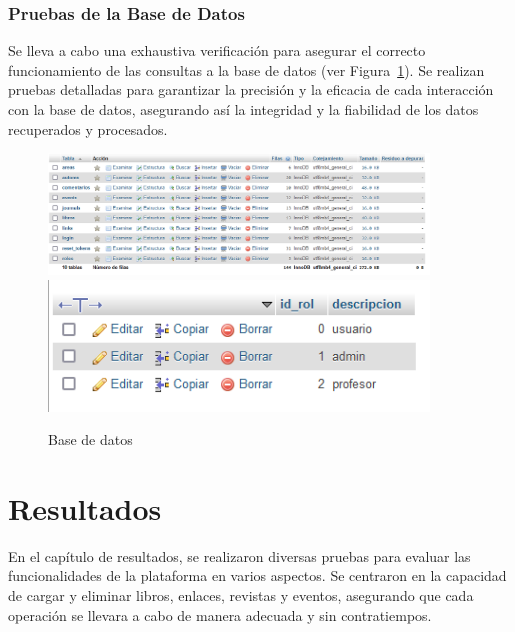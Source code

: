 \documentclass[a4paper, 12pt]{book}
\begin{document}
\subsection{Pruebas de la Base de Datos}
\label{sec:base_datos}
Se lleva a cabo una exhaustiva verificación para asegurar el correcto funcionamiento de las consultas a la base de datos 
(ver Figura~\ref{fig:db}). Se realizan pruebas detalladas para garantizar la precisión y la eficacia de cada interacción 
con la base de datos, asegurando así la integridad y la fiabilidad de los datos recuperados y procesados.

\begin{figure}
  \centering
  \includegraphics[width=0.9\textwidth]{img/db.png}
  \includegraphics[width=0.9\textwidth]{img/roldb.png}
  \caption{Base de datos}
  \label{fig:db}
\end{figure}



\cleardoublepage
\chapter{Resultados}
\label{chap:resultados}

En el capítulo de resultados, se realizaron diversas pruebas para evaluar las funcionalidades de la plataforma en varios aspectos. Se centraron en la 
capacidad de cargar y eliminar libros, enlaces, revistas y eventos, asegurando que cada operación se llevara a cabo de manera adecuada y sin contratiempos.
\end{document}
